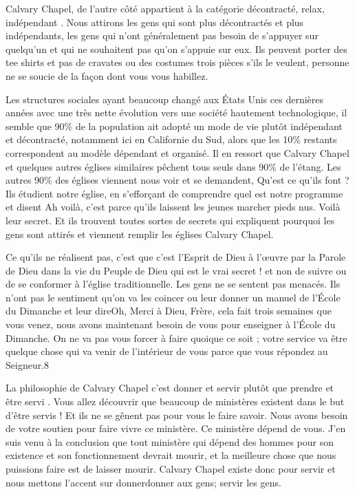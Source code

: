 Calvary Chapel, de l’autre côté appartient à la catégorie \og décontracté, relax, indépendant \fg{}. Nous attirons les gens qui
sont plus décontractés et plus indépendants, les gens qui n’ont généralement pas besoin de s’appuyer sur quelqu’un
et qui ne souhaitent pas qu’on s’appuie sur eux. Ils peuvent porter des tee shirts et pas de cravates ou des costumes
trois pièces s’ils le veulent, personne ne se soucie de la façon dont vous vous habillez.

Les structures sociales ayant beaucoup changé aux États Unis ces dernières années avec une très nette évolution vers
une société hautement technologique, il semble que 90\% de la population ait adopté un mode de vie plutôt
indépendant et décontracté, notamment ici en Californie du Sud, alors que les 10\% restants correspondent au modèle
dépendant et organisé. Il en ressort que Calvary Chapel et quelques autres églises similaires pêchent tous seuls dans
90\% de l'étang. Les autres 90\% des églises viennent nous voir et se demandent, \og Qu’est ce qu’ils font ?\fg{} Ils étudient
notre église, en s’efforçant de comprendre quel est notre programme et disent \og Ah voilà, c’est parce qu’ils laissent les
jeunes marcher pieds nus. Voilà leur secret. \fg{} Et ils trouvent toutes sortes de \og secrets\fg{} qui expliquent pourquoi les
gens sont attirés et viennent remplir les églises Calvary Chapel.

Ce qu’ils ne réalisent pas, c’est que c’est l’Esprit de Dieu à l’œuvre par la Parole de Dieu dans la vie du Peuple de Dieu
qui est le vrai secret ! et non de suivre ou de se conformer à l’église traditionnelle. Les gens ne se sentent pas
menacés. Ils n’ont pas le sentiment qu’on va les coincer ou leur donner un manuel de l’École du Dimanche et leur
dire\frcolon\og Oh, Merci à Dieu, Frère, cela fait trois semaines que vous venez, nous avons maintenant besoin de vous pour
enseigner à l’École du Dimanche.\fg{} On ne va pas vous forcer à faire quoique ce soit ; votre service va être quelque
chose qui va venir de l'intérieur de vous parce que vous répondez au Seigneur.8

La philosophie de Calvary Chapel c’est \og donner et servir \fg{} plutôt que \og prendre et être servi \fg{}. Vous allez découvrir
que beaucoup de ministères existent dans le but d’être servis ! Et ils ne se gênent pas pour vous le faire savoir. \og Nous
avons besoin de votre soutien pour faire vivre ce ministère. Ce ministère dépend de vous.\fg{} J’en suis venu à la
conclusion que tout ministère qui dépend des hommes pour son existence et son fonctionnement devrait mourir, et la
meilleure chose que nous puissions faire est de laisser mourir. Calvary Chapel existe donc pour servir et nous mettons
l’accent sur donner\frcolon donner aux gens; servir les gens.

